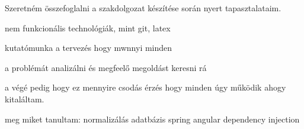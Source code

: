 Szeretném összefoglalni a szakdolgozat készítése során nyert tapasztalataim.


nem funkcionális technológiák, mint git, latex

kutatómunka a tervezés hogy mwnnyi minden

a problémát analizálni és megfeelő megoldást keresni rá

a végé pedig hogy ez mennyire csodás érzés hogy minden úgy működik ahogy kitaláltam.


meg miket tanultam:
normalizálás adatbázis
spring  angular
dependency injection